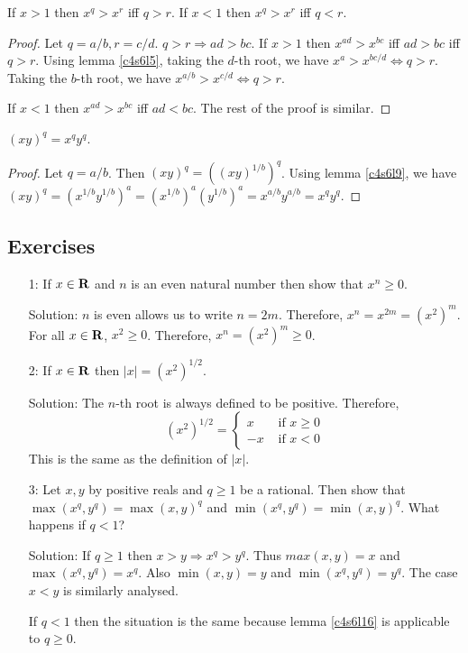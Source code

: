 \begin{lem}\label{c4s6l17}
If $x > 1$ then $x^q > x^r$ iff $q > r$. If $x < 1$ then $x^q > x^r$ iff 
$q < r$.
\end{lem}
\begin{proof}
Let $q = a/b, r = c/d$. $q > r \Rightarrow ad > bc$. If $x > 1$ then
$x^{ad} > x^{bc}$ iff $ad > bc$ iff $q > r$. Using lemma \ref{c4s6l5},
taking the $d$-th root, we have $x^a > x^{bc/d} \Leftrightarrow q > r$.
Taking the $b$-th root, we have $x^{a/b} > x^{c/d} \Leftrightarrow q > r$.

If $x < 1$ then $x^{ad} > x^{bc}$ iff $ad < bc$. The rest of the proof is
similar.
\end{proof}

\begin{lem}\label{c4s6l18}
$(xy)^q = x^q y^q$.
\end{lem}
\begin{proof}
Let $q = a/b$. Then $(xy)^q = ((xy)^{1/b})^q$. Using lemma \ref{c4s6l9}, we
have $(xy)^q = (x^{1/b} y^{1/b})^a = (x^{1/b})^a (y^{1/b})^a = 
x^{a/b}y^{a/b} = x^qy^q$.
\end{proof}

\subsection{Exercises}
\begin{enumerate}
\item[1:] If $x \in \mathbf{R}$ and $n$ is an even natural number then show that
$x^n \ge 0$.
\item[Solution:] $n$ is even allows us to write $n = 2m$. Therefore, $x^n
= x^{2m} = (x^2)^m$. For all $x \in \mathbf{R}$, $x^2 \ge 0$. Therefore, $x^n
= (x^2)^m \ge 0$.

\item[2:] If $x \in \mathbf{R}$ then $|x| = (x^2)^{1/2}$.
\item[Solution:] The $n$-th root is always defined to be positive. 
Therefore, 
\[
(x^2)^{1/2} = \begin{cases}
x & \text{ if } x \ge 0 \\
-x & \text{ if } x < 0
\end{cases}
\]
This is the same as the definition of $|x|$.

\item[3:] Let $x, y$ by positive reals and $q \ge 1$ be a rational. Then
show that $\max(x^q, y^q) = \max(x, y)^q$ and $\min(x^q, y^q) = 
\min(x, y)^q$. What happens if $q < 1$?
\item[Solution:] If $q \ge 1$ then $x > y \Rightarrow x^q > y^q$. Thus
$max(x, y) = x$ and $\max(x^q, y^q) = x^q$. Also $\min(x, y) = y$ and $\min(
x^q, y^q) = y^q$. The case $x < y$ is similarly analysed.

If $q < 1$ then the situation is the same because lemma \ref{c4s6l16} is
applicable to $q \ge 0$.
\end{enumerate}
